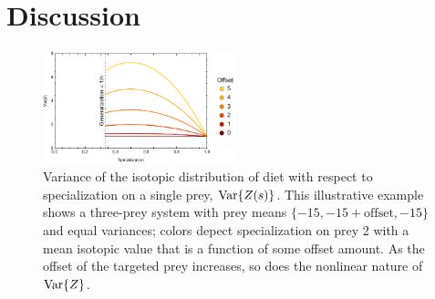 \documentclass{frontiersSCNS}
\begin{document}







\section{Discussion}











\begin{figure}[h!]
\centering
\includegraphics[width=0.5\textwidth]{fig_var.pdf}
\caption{
Variance of the isotopic distribution of diet with respect to specialization on a single prey, ${\rm Var}\{Z(s)\}$.
This illustrative example shows a three-prey system with prey means $\{-15,-15+\mbox{offset},-15\}$ and equal variances; colors depect specialization on prey 2 with a mean isotopic value that is a function of some offset amount.
As the offset of the targeted prey increases, so does the nonlinear nature of ${\rm Var}\{Z\}$.
}
  \label{figvar}
\end{figure}
\end{document}
